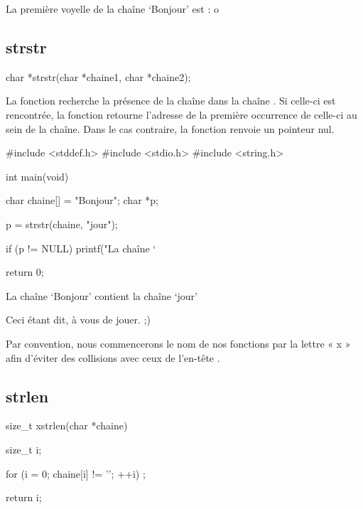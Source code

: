 \begin{C}
La première voyelle de la chaîne `Bonjour' est : o
\end{C}

\subsection{strstr}
\label{strstr-1}

\begin{C}
char *strstr(char *chaine1, char *chaine2);
\end{C}

La fonction  recherche la présence de la chaîne
 dans la chaîne . Si celle-ci est
rencontrée, la fonction retourne l'adresse de la première occurrence de
celle-ci au sein de la chaîne. Dans le cas contraire, la fonction
renvoie un pointeur nul.

\begin{C}
#include <stddef.h>
#include <stdio.h>
#include <string.h>


int main(void)
{
    char chaine[] = "Bonjour";
    char *p;

    p = strstr(chaine, "jour");

    if (p != NULL)
        printf("La chaîne `%

    return 0;
}
\end{C}

\begin{C}
La chaîne `Bonjour' contient la chaîne `jour'
\end{C}

Ceci étant dit, à vous de jouer. ;)

\begin{infobox}
Par convention, nous commencerons le nom de nos fonctions par la 
lettre « x » afin d'éviter des collisions avec ceux de l'en-tête 
.
\end{infobox}

\subsection{strlen}
\label{strlen}

\begin{C}
size_t xstrlen(char *chaine)
{
    size_t i;

    for (i = 0; chaine[i] != '\0'; ++i)
        ;

    return i;
}
\end{C}

